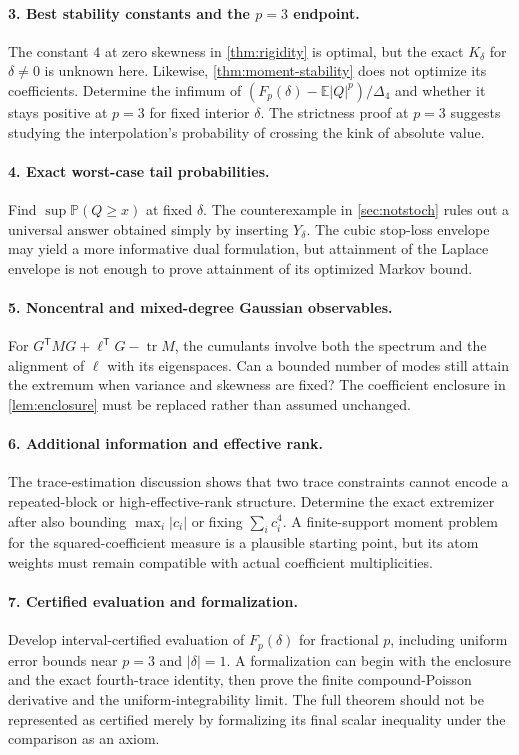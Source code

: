 \documentclass[11pt]{article}
\numberwithin{equation}{section}
\theoremstyle{definition}
\theoremstyle{remark}
\newcommand{\E}{\mathbb E}
\newcommand{\Prob}{\mathbb P}
\newcommand{\tr}{\operatorname{tr}}
\begin{document}
\paragraph{3. Best stability constants and the $p=3$ endpoint.}
The constant $4$ at zero skewness in \cref{thm:rigidity} is optimal, but the exact $K_\delta$ for $\delta\ne0$ is unknown here. Likewise, \cref{thm:moment-stability} does not optimize its coefficients. Determine the infimum of $(F_p(\delta)-\E|Q|^p)/\Delta_4$ and whether it stays positive at $p=3$ for fixed interior $\delta$. The strictness proof at $p=3$ suggests studying the interpolation's probability of crossing the kink of absolute value.

\paragraph{4. Exact worst-case tail probabilities.}
Find $\sup\Prob(Q\geq x)$ at fixed $\delta$. The counterexample in \cref{sec:notstoch} rules out a universal answer obtained simply by inserting $Y_\delta$. The cubic stop-loss envelope may yield a more informative dual formulation, but attainment of the Laplace envelope is not enough to prove attainment of its optimized Markov bound.

\paragraph{5. Noncentral and mixed-degree Gaussian observables.}
For $G^{\mathsf T}MG+\ell^{\mathsf T}G-\tr M$, the cumulants involve both the spectrum and the alignment of $\ell$ with its eigenspaces. Can a bounded number of modes still attain the extremum when variance and skewness are fixed? The coefficient enclosure in \cref{lem:enclosure} must be replaced rather than assumed unchanged.

\paragraph{6. Additional information and effective rank.}
The trace-estimation discussion shows that two trace constraints cannot encode a repeated-block or high-effective-rank structure. Determine the exact extremizer after also bounding $\max_i|c_i|$ or fixing $\sum_i c_i^4$. A finite-support moment problem for the squared-coefficient measure is a plausible starting point, but its atom weights must remain compatible with actual coefficient multiplicities.

\paragraph{7. Certified evaluation and formalization.}
Develop interval-certified evaluation of $F_p(\delta)$ for fractional $p$, including uniform error bounds near $p=3$ and $|\delta|=1$. A formalization can begin with the enclosure and the exact fourth-trace identity, then prove the finite compound-Poisson derivative and the uniform-integrability limit. The full theorem should not be represented as certified merely by formalizing its final scalar inequality under the comparison as an axiom.
\end{document}
